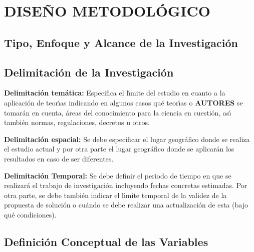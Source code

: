 %
%

\chapter{DISE\~{N}O METODOL\'{O}GICO}


\section{Tipo, Enfoque y Alcance de la Investigaci\'on }
\label{cap2:sec:tipo_enfoque_y_alcance_de_la_investigacion}


\section{Delimitaci\'on de la Investigaci\'on}
\label{cap2:sec:delimitacion_de_la_investigacion}

\textbf{Delimitaci\'{o}n tem\'{a}tica:} Especifica el l\'{\i}mite del estudio en cuanto a la aplicaci\'{o}n 
de teor\'{\i}as indicando en algunos casos qu\'{e} teor\'{\i}as o \textbf{AUTORES} se tomar\'{a}n en cuenta, 
\'{a}reas del conocimiento para la ciencia en cuesti\'{o}n, as\'{\i} tambi\'{e}n normas, 
regulaciones, decretos u otros. 

\textbf{Delimitaci\'{o}n espacial:} Se debe especificar el lugar geogr\'{a}fico donde se realiza el estudio 
actual y por otra parte el lugar geogr\'{a}fico donde se aplicar\'{a}n los resultados en caso de 
ser diferentes.

\textbf{Delimitaci\'{o}n Temporal:} Se debe definir el periodo de tiempo en que se realizar\'{a} el trabajo 
de investigaci\'{o}n incluyendo fechas concretas estimadas. Por otra parte, se debe tambi\'{e}n 
indicar el l\'{\i}mite temporal de la validez de la propuesta de soluci\'{o}n o cu\'{a}ndo se debe 
realizar una actualizaci\'{o}n de esta (bajo qu\'{e} condiciones).


\section{Definici\'{o}n Conceptual de las Variables}
\label{cap2:sec:definicion_conceptual_de_las_variables}

